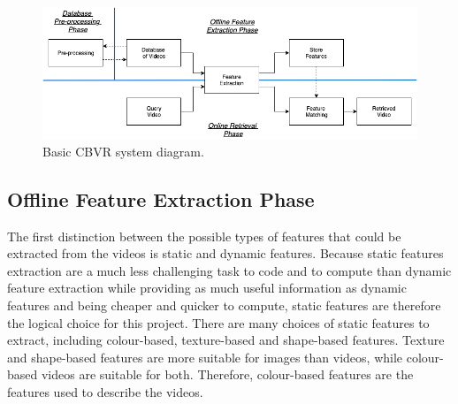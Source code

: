\begin{figure}[h]
\centerline{\includegraphics[width=\textwidth]{figures/design/basic_cbvr_phases.png}}
\caption{\label{fig:basic-cbvr-diagram}Basic CBVR system diagram.}
\end{figure}

\subsection{Offline Feature Extraction Phase}
\label{sec:design-offline-feature-extraction}

The first distinction between the possible types of features that could be extracted from the videos is static and dynamic features. Because static features extraction are a much less challenging task to code and to compute than dynamic feature extraction while providing as much useful information as dynamic features and being cheaper and quicker to compute, static features are therefore the logical choice for this project. There are many choices of static features to extract, including colour-based, texture-based and shape-based features. Texture and shape-based features are more suitable for images than videos, while colour-based videos are suitable for both. Therefore, colour-based features are the features used to describe the videos.\\

